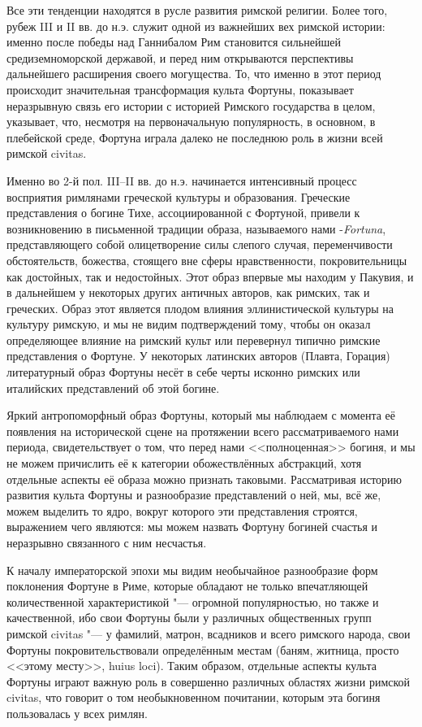 Все эти тенденции находятся в русле развития римской религии. Более того, рубеж III и II вв. до н.э. служит одной из важнейших вех римской истории: именно после победы над Ганнибалом Рим становится сильнейшей средиземноморской державой, и перед ним открываются перспективы дальнейшего расширения своего могущества. То, что именно в этот период происходит значительная трансформация культа Фортуны, показывает неразрывную связь его истории с историей Римского государства в целом, указывает, что, несмотря на первоначальную популярность, в основном, в плебейской среде, Фортуна играла далеко не последнюю роль в жизни всей римской civitas.

Именно во 2-й пол. III--II вв. до н.э. начинается интенсивный процесс восприятия римлянами греческой культуры и образования. Греческие представления о богине Тихе, ассоциированной с Фортуной, привели к возникновению в письменной традиции образа, называемого нами -\textit{Fortuna}, представляющего собой олицетворение силы слепого случая, переменчивости обстоятельств, божества, стоящего вне сферы нравственности, покровительницы как достойных, так и недостойных. Этот образ впервые мы находим у Пакувия, и в дальнейшем у некоторых других античных авторов, как римских, так и греческих. Образ этот является плодом влияния эллинистической культуры на культуру римскую, и мы не видим подтверждений тому, чтобы он оказал определяющее влияние на римский культ или перевернул типично римские представления о Фортуне. У некоторых латинских авторов (Плавта, Горация) литературный образ Фортуны несёт в себе черты исконно римских или италийских представлений об этой богине.

Яркий антропоморфный образ Фортуны, который мы наблюдаем с момента её появления на исторической сцене на протяжении всего рассматриваемого нами периода, свидетельствует о том, что перед нами <<полноценная>> богиня, и мы не можем причислить её к категории обожествлённых абстракций, хотя отдельные аспекты её образа можно признать таковыми. Рассматривая историю развития культа Фортуны и разнообразие представлений о ней, мы, всё же, можем выделить то ядро, вокруг которого эти представления строятся, выражением чего являются: мы можем назвать Фортуну богиней счастья и неразрывно связанного с ним несчастья.

К началу императорской эпохи мы видим необычайное разнообразие форм поклонения Фортуне в Риме, которые обладают не только впечатляющей количественной характеристикой "--- огромной популярностью, но также и качественной, ибо свои Фортуны были у различных общественных групп римской civitas "--- у фамилий, матрон, всадников и всего римского народа, свои Фортуны покровительствовали определённым местам (баням, житница, просто <<этому месту>>, huius loci). Таким образом, отдельные аспекты культа Фортуны играют важную роль в совершенно различных областях жизни римской civitas, что говорит о том необыкновенном почитании, которым эта богиня пользовалась у всех римлян.

